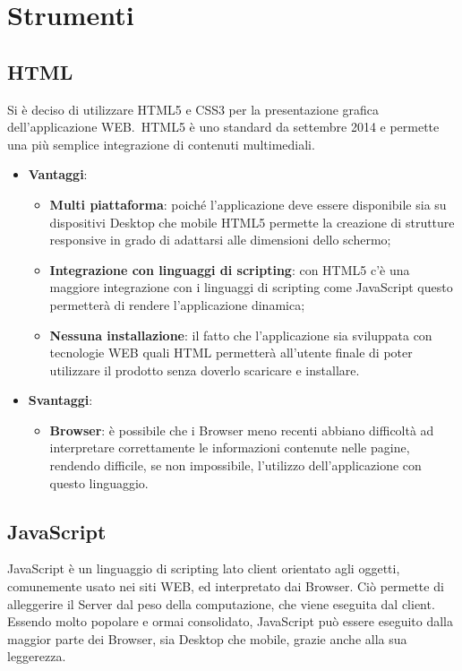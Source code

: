 \section{Strumenti}
	\subsection{HTML}{
		Si è deciso di utilizzare HTML5 e CSS3 per la presentazione grafica dell'applicazione WEB.\
		HTML5 è uno standard da settembre 2014 e permette una più semplice integrazione di contenuti multimediali.
	
		\begin{itemize}
			\item \textbf{Vantaggi}: 
			\begin{itemize}
				\item \textbf{Multi piattaforma}: poiché l'applicazione deve essere disponibile sia su dispositivi Desktop che mobile HTML5 permette la creazione di strutture responsive in grado di adattarsi alle dimensioni dello schermo;
				\item \textbf{Integrazione con linguaggi di scripting}: con HTML5 c'è una maggiore integrazione con i linguaggi di scripting come JavaScript questo permetterà di rendere l'applicazione dinamica;
				\item \textbf{Nessuna installazione}: il fatto che l'applicazione sia sviluppata con tecnologie WEB\ped{g} quali HTML permetterà all'utente finale di poter utilizzare il prodotto senza doverlo scaricare e installare.
			\end{itemize}
			\item \textbf{Svantaggi}:
			\begin{itemize}
				\item \textbf{Browser}: è possibile che i Browser meno recenti abbiano difficoltà ad interpretare correttamente le informazioni contenute nelle pagine, rendendo difficile, se non impossibile, l'utilizzo dell'applicazione con questo linguaggio.
			\end{itemize}
		\end{itemize}
		}
	\subsection{JavaScript}{
		JavaScript è un linguaggio di scripting lato client orientato agli oggetti, comunemente usato nei siti WEB, ed interpretato dai Browser. Ciò permette di alleggerire il Server dal peso della computazione, che viene eseguita dal client. Essendo molto popolare e ormai consolidato, JavaScript può essere eseguito dalla maggior parte dei Browser, sia Desktop che mobile, grazie anche alla sua leggerezza. 		}
